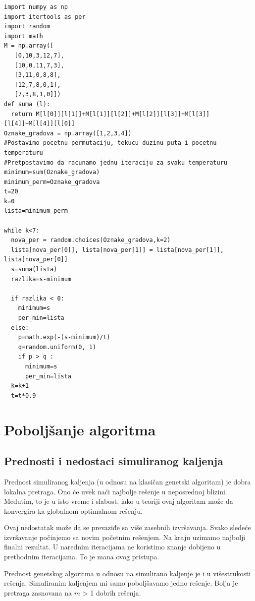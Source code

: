 \documentclass[a4paper]{article}
\begin{document}
\begin{lstlisting}[caption={Rešavanje problema TSP korišćenjem SA algoritma},frame=single, label=simple]
import numpy as np
import itertools as per
import random
import math 
M = np.array([
   [0,10,3,12,7],
   [10,0,11,7,3],
   [3,11,0,8,8],
   [12,7,8,0,1],
   [7,3,8,1,0]])
def suma (l):
  return M[l[0]][l[1]]+M[l[1]][l[2]]+M[l[2]][l[3]]+M[l[3]][l[4]]+M[l[4]][l[0]]
Oznake_gradova = np.array([1,2,3,4])
#Postavimo pocetnu permutaciju, tekucu duzinu puta i pocetnu temperaturu
#Pretpostavimo da racunamo jednu iteraciju za svaku temperaturu
minimum=sum(Oznake_gradova)
minimum_perm=Oznake_gradova
t=20
k=0
lista=minimum_perm

while k<7:
  nova_per = random.choices(Oznake_gradova,k=2)
  lista[nova_per[0]], lista[nova_per[1]] = lista[nova_per[1]], lista[nova_per[0]]
  s=suma(lista)
  razlika=s-minimum
  
  if razlika < 0:
    minimum=s
    per_min=lista
  else:
    p=math.exp(-(s-minimum)/t)
    q=random.uniform(0, 1)
    if p > q :
      minimum=s
      per_min=lista
  k=k+1
  t=t*0.9
\end{lstlisting}






\section{Poboljšanje algoritma}

\subsection{Prednosti i nedostaci simuliranog kaljenja}
Prednost simuliranog kaljenja (u odnosu na klasičan genetski algoritam) je dobra lokalna pretraga.\cite{ga_vs_sa_tech_report, gannealingthesis} Ono će uvek naći najbolje rešenje u neposrednoj blizini. Međutim, to je u isto vreme i slabost, iako u teoriji ovaj algoritam može da konvergira ka globalnom optimalnom rešenju.\cite{gannealingthesis} \par
Ovaj nedostatak može da se prevaziđe sa više zasebnih izvršavanja. Svako sledeće izvršavanje počinjemo sa novim početnim rešenjem. Na kraju uzimamo najbolji finalni rezultat. U narednim iteracijama ne koristimo znanje dobijeno u prethodnim iteracijama. To je mana ovog pristupa. \par
Prednost genetskog algoritma u odnosu na simulirano kaljenje je i u višestrukosti rešenja.\cite{gannealingthesis} Simuliranim kaljenjem mi samo poboljšavamo jedno rešenje. Bolja je pretraga zasnovana na $m$ > 1 dobrih rešenja.
\end{document}
